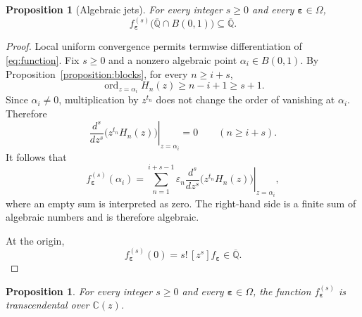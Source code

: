 \documentclass[10pt]{amsart}
\newtheorem{proposition}[theorem]{Proposition}
\theoremstyle{definition}
\theoremstyle{remark}
\numberwithin{equation}{section}
\newcommand{\C}{\mathbb C}
\newcommand{\Qbar}{\overline{\mathbb Q}}
\newcommand{\ord}{\operatorname{ord}}
\newcommand{\B}{B(0,1)}
\begin{document}
\begin{proposition}[Algebraic jets]\label{proposition:values}
For every integer $s\geq0$ and every
$\boldsymbol\varepsilon\in\Omega$,
\[
        f_{\boldsymbol\varepsilon}^{(s)}
        \bigl(\Qbar\cap\B\bigr)
        \subseteq\Qbar.
\]
\end{proposition}

\begin{proof}
Local uniform convergence permits termwise differentiation of
\eqref{eq:function}. Fix $s\geq0$ and a nonzero algebraic point
$\alpha_i\in\B$. By Proposition~\ref{proposition:blocks}, for every
$n\geq i+s$,
\[
        \ord_{z=\alpha_i}H_n(z)
        \geq n-i+1
        \geq s+1.
\]
Since $\alpha_i\neq0$, multiplication by $z^{t_n}$ does not change the
order of vanishing at $\alpha_i$. Therefore
\[
        \left.
        \frac{d^s}{dz^s}\bigl(z^{t_n}H_n(z)\bigr)
        \right|_{z=\alpha_i}
        =0
        \qquad(n\geq i+s).
\]
It follows that
\begin{equation}\label{eq:finite-jet-sum}
        f_{\boldsymbol\varepsilon}^{(s)}(\alpha_i)
        =
        \sum_{n=1}^{i+s-1}
        \varepsilon_n
        \left.
        \frac{d^s}{dz^s}\bigl(z^{t_n}H_n(z)\bigr)
        \right|_{z=\alpha_i},
\end{equation}
where an empty sum is interpreted as zero. The right-hand side is a finite
sum of algebraic numbers and is therefore algebraic.

At the origin,
\[
        f_{\boldsymbol\varepsilon}^{(s)}(0)
        =
        s!\,[z^s]f_{\boldsymbol\varepsilon}
        \in\Qbar.
\]
\end{proof}

\begin{proposition}\label{proposition:transcendence}
For every integer $s\geq 0$ and every
$\boldsymbol{\varepsilon}\in\Omega$, the function
$f_{\boldsymbol{\varepsilon}}^{(s)}$ is transcendental over $\C(z)$.
\end{proposition}
\end{document}
